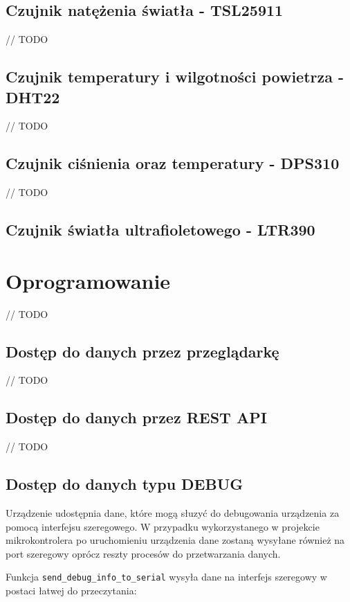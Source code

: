 \documentclass[12pt,a4paper]{article}
\begin{document}
\subsection{Czujnik natężenia światła - TSL25911}
// TODO

\subsection{Czujnik temperatury i wilgotności powietrza - DHT22}
// TODO

\subsection{Czujnik ciśnienia oraz temperatury - DPS310}
// TODO

\subsection{Czujnik światła ultrafioletowego - LTR390}

\section{Oprogramowanie}
// TODO

\subsection{Dostęp do danych przez przeglądarkę}
// TODO

\subsection{Dostęp do danych przez REST API}
// TODO

\subsection{Dostęp do danych typu DEBUG}

Urządzenie udostępnia dane, które mogą słuzyć do debugowania urządzenia za pomocą interfejsu szeregowego. W przypadku wykorzystanego w projekcie
mikrokontrolera po uruchomieniu urządzenia dane zostaną wysyłane również na port szeregowy oprócz reszty procesów do przetwarzania danych.

Funkcja \texttt{send\_debug\_info\_to\_serial} wysyła dane na interfejs szeregowy w postaci łatwej do przeczytania:
\end{document}
